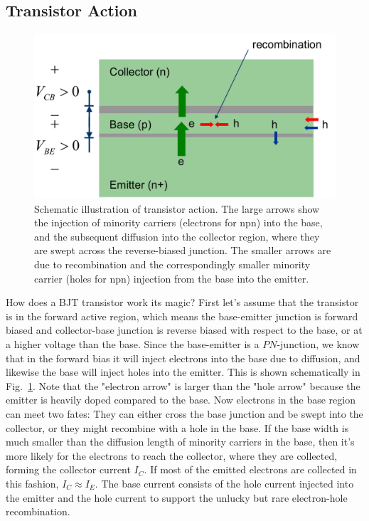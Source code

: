 \subsection{Transistor Action}
\begin{figure}[tb]
\centering
\includegraphics[width=.65\columnwidth]{slide9_bjt_action}
\caption{Schematic illustration of transistor action.  The large arrows show the injection of minority carriers (electrons for npn) into the base, and the subsequent diffusion into the collector region, where they are swept across the reverse-biased junction.  The smaller arrows are due to recombination and the correspondingly smaller minority carrier (holes for npn) injection from the base into the emitter.}
\label{fig:slide9_bjt_action}
\end{figure}
How does a BJT transistor work its magic?   First let's assume that the transistor is in the forward active region, which means the base-emitter junction is forward biased and collector-base junction is reverse biased with respect to the base, or at a higher voltage than the base.  
Since the base-emitter is a $PN$-junction, we know that in the forward bias it will inject electrons into the base due to diffusion, and likewise the base will inject holes into the emitter.  This is shown schematically in Fig.~\ref{fig:slide9_bjt_action}.  Note that the "electron arrow" is larger than the "hole arrow" because the emitter is heavily doped compared to the base.  Now electrons in the base region can meet two fates:  They can either cross the base junction and be swept into the collector, or they might recombine with a hole in the base.  If the base width is much smaller than the diffusion length of minority carriers in the base, then it's more likely for the electrons to reach the collector, where they are collected, forming the collector current $I_C$.  If most of the emitted electrons are collected in this fashion, $I_C \approx I_E$.  
The base current consists of the hole current injected into the emitter and the hole current to support the unlucky but rare electron-hole recombination.  
